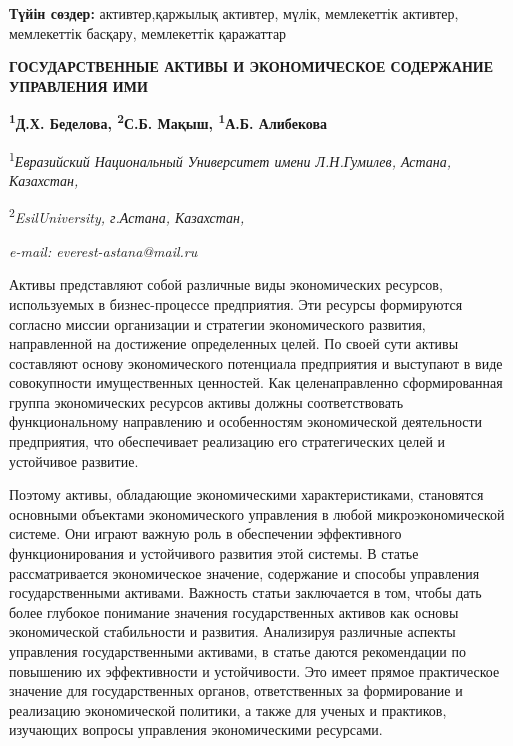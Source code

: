 {\bfseries Түйін сөздер:} активтер,қаржылық активтер, мүлік, мемлекеттік
активтер, мемлекеттік басқару, мемлекеттік қаражаттар

\begin{articleheader}
{\bfseries ГОСУДАРСТВЕННЫЕ АКТИВЫ И ЭКОНОМИЧЕСКОЕ СОДЕРЖАНИЕ УПРАВЛЕНИЯ ИМИ}

{\bfseries
\textsuperscript{1}Д.Х. Беделова\textsuperscript{\envelope },
\textsuperscript{2}С.Б. Мақыш,
\textsuperscript{1}А.Б. Алибекова}
\end{articleheader}

\begin{affiliation}
\textsuperscript{1}\emph{Евразийский Национальный Университет имени Л.Н.Гумилев, Астана, Казахстан,}

\textsuperscript{2}\emph{EsilUniversity, г.Астана, Казахстан,}

\emph{e-mail: everest-astana@mail.ru}
\end{affiliation}

Активы представляют собой различные виды экономических ресурсов,
используемых в бизнес-процессе предприятия. Эти ресурсы формируются
согласно миссии организации и стратегии экономического развития,
направленной на достижение определенных целей. По своей сути активы
составляют основу экономического потенциала предприятия и выступают в
виде совокупности имущественных ценностей. Как целенаправленно
сформированная группа экономических ресурсов активы должны
соответствовать функциональному направлению и особенностям экономической
деятельности предприятия, что обеспечивает реализацию его стратегических
целей и устойчивое развитие.

Поэтому активы, обладающие экономическими характеристиками, становятся
основными объектами экономического управления в любой микроэкономической
системе. Они играют важную роль в обеспечении эффективного
функционирования и устойчивого развития этой системы. В статье
рассматривается экономическое значение, содержание и способы управления
государственными активами. Важность статьи заключается в том, чтобы дать
более глубокое понимание значения государственных активов как основы
экономической стабильности и развития. Анализируя различные аспекты
управления государственными активами, в статье даются рекомендации по
повышению их эффективности и устойчивости. Это имеет прямое практическое
значение для государственных органов, ответственных за формирование и
реализацию экономической политики, а также для ученых и практиков,
изучающих вопросы управления экономическими ресурсами.

